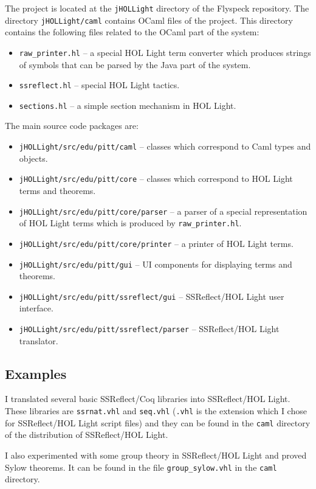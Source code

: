 \documentclass[a4paper]{article}
\begin{document}
The project is located at the {\tt jHOLLight} directory of the Flyspeck repository. The directory {\tt jHOLLight/caml} contains OCaml files of the project. This directory contains the following files related to the OCaml part of the system:
\begin{itemize}
\item {\tt raw\_printer.hl} -- a special HOL Light term converter which produces strings of symbols that can be parsed by the Java part of the system.
\item {\tt ssreflect.hl} -- special HOL Light tactics.
\item {\tt sections.hl} -- a simple section mechanism in HOL Light.
\end{itemize}

The main source code packages are:
\begin{itemize}
\item {\tt jHOLLight/src/edu/pitt/caml} -- classes which correspond to Caml types and objects.
\item {\tt jHOLLight/src/edu/pitt/core} -- classes which correspond to HOL Light terms and theorems.
\item {\tt jHOLLight/src/edu/pitt/core/parser} -- a parser of a special representation of HOL Light terms which is produced by {\tt raw\_printer.hl}.
\item {\tt jHOLLight/src/edu/pitt/core/printer} -- a printer of HOL Light terms.
\item {\tt jHOLLight/src/edu/pitt/gui} -- UI components for displaying terms and theorems.
\item {\tt jHOLLight/src/edu/pitt/ssreflect/gui} -- SSReflect/HOL Light user interface.
\item {\tt jHOLLight/src/edu/pitt/ssreflect/parser} -- SSReflect/HOL Light translator.
\end{itemize}


\subsection{Examples}
I translated several basic SSReflect/Coq libraries into SSReflect/HOL Light. These libraries are {\tt ssrnat.vhl} and {\tt seq.vhl} ({\tt .vhl} is the extension which I chose for SSReflect/HOL Light script files) and they can be found in the {\tt caml} directory of the distribution of SSReflect/HOL Light.

I also experimented with some group theory in SSReflect/HOL Light and proved Sylow theorems. It can be found in the file {\tt group\_sylow.vhl} in the {\tt caml} directory. 
\end{document}
